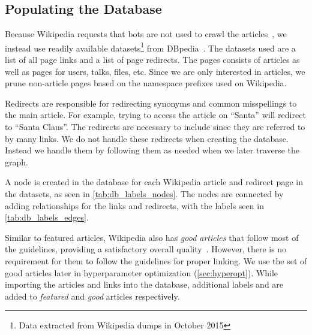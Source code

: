 \subsection{Populating the Database}\label{sec:db_populate}
Because Wikipedia requests that bots are not used to crawl the articles~\cite{wiki-bots}, we instead use readily available datasets\footnote{Data extracted from Wikipedia dumps in October 2015} from DBpedia~\cite{dbpedia}. The datasets used are a list of all page links and a list of page redirects. The pages consists of articles as well as pages for users, talks, files, etc. Since we are only interested in articles, we prune non-article pages based on the namespace prefixes used on Wikipedia.

Redirects are responsible for redirecting synonyms and common misspellings to the main article. For example, trying to access the article on ``Santa'' will redirect to ``Santa Claus''. The redirects are necessary to include since they are referred to by many links. We do not handle these redirects when creating the database. Instead we handle them by following them as needed when we later traverse the graph.


A node is created in the database for each Wikipedia article and redirect page in the datasets, as seen in \cref{tab:db_labels_nodes}.
The nodes are connected by adding relationships for the links and redirects, with the labels seen in \cref{tab:db_labels_edges}.

Similar to featured articles, Wikipedia also has \emph{good articles} that follow most of the guidelines, providing a satisfactory overall quality~\cite{wiki-good-articles}. However, there is no requirement for them to follow the guidelines for proper linking. We use the set of good articles later in hyperparameter optimization (\cref{sec:hyperopt}). While importing the articles and links into the database, additional labels  and  are added to \emph{featured} and \emph{good} articles respectively. 

